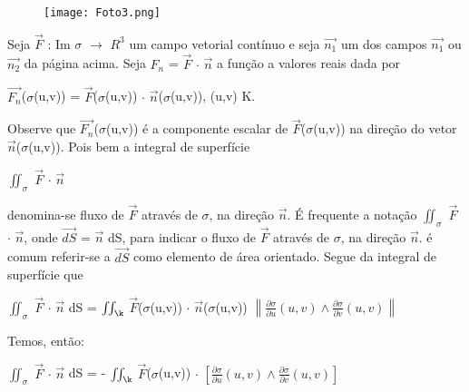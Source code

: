 \documentclass[11pt,a4paper]{article}
\begin{document}
    \begin{figure}[h]	
	\centering %
	\texttt{[image: Foto3.png]} 
	\end{figure}
	
	Seja $\Vec{F}$ : Im $\sigma$ $\rightarrow$ $R^3$ um campo vetorial contínuo e seja $\Vec{n_1}$ um dos campos $\Vec{n_1}$ ou $\Vec{n_2}$ da página acima. Seja $F_n$ = $\Vec{F}$ $\cdot$ $\Vec{n}$ a função a valores reais dada por\\

    \begin{center}	
	$\Vec{F_n}$($\sigma$(u,v)) = $\Vec{F}$($\sigma$(u,v)) $\cdot$ $\Vec{n}$($\sigma$(u,v)), (u,v) \in K.\\
	\end{center}
	
	Observe que $\Vec{F_n}$($\sigma$(u,v)) é a componente escalar de $\Vec{F}$($\sigma$(u,v)) na direção do vetor $\Vec{n}$($\sigma$(u,v)). Pois bem a integral de superfície\\
	
	\begin{center}	
        $\iint_{\sigma}^{}$ $\Vec{F}$ $\cdot$ $\Vec{n}$\\
	\end{center}
	
	denomina-se fluxo de $\Vec{F}$ através de $\sigma$, na direção $\Vec{n}$. É frequente a notação  $\iint_{\sigma}^{}$ $\Vec{F}$ $\cdot$ $\Vec{n}$, onde $\Vec{dS}$ = $\Vec{n}$ dS, para indicar o fluxo de $\Vec{F}$ através de $\sigma$, na direção $\Vec{n}$. é comum referir-se a $\Vec{dS}$ como elemento de área orientado. Segue da integral de superfície que\\
	
	\begin{center}	
        $\iint_{\sigma}^{}$ $\Vec{F}$ $\cdot$ $\Vec{n}$ dS = $\iint_{\k}^{}$ $\Vec{F}$($\sigma$(u,v)) $\cdot$ $\Vec{n}$($\sigma$(u,v)) ${\left \| \frac{\partial \sigma }{\partial u}(u,v) \wedge \frac{\partial \sigma }{\partial v}(u,v) \right \|}$
	\end{center}
	
	Temos, então:\\
	
	\begin{center}	
        $\iint_{\sigma}^{}$ $\Vec{F}$ $\cdot$ $\Vec{n}$ dS = - $\iint_{\k}^{}$ $\Vec{F}$($\sigma$(u,v)) $\cdot$ $\left [ \frac{\partial \sigma }{\partial u}(u,v) \wedge \frac{\partial \sigma }{\partial v}(u,v) \right ]$\\
	\end{center}
	
\end{document}
